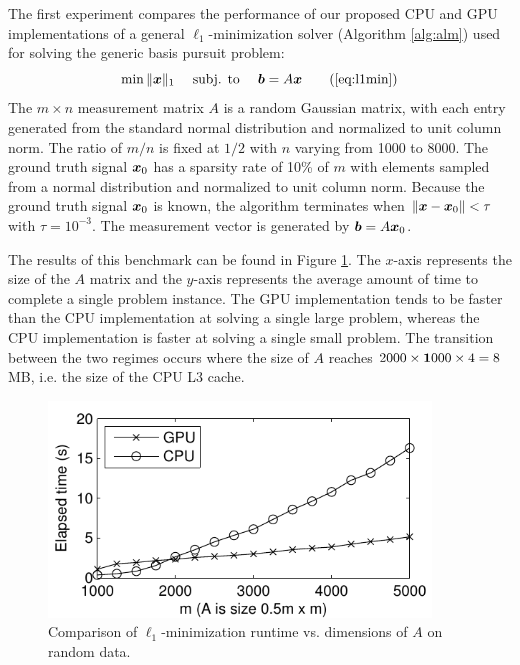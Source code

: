 The first experiment compares the performance of our proposed CPU and GPU
implementations of a general $\ell_1$-minimization solver (Algorithm \eqref{alg:alm})
used for solving the generic basis pursuit problem:
\begin{equation} 
\min \|\xx\|_1\quad \mbox{ subj. to }\quad \bb = A\xx
\tag{\ref{eq:l1min}}
\end{equation}
The $m \times n$ measurement matrix $A$ is a random Gaussian matrix, with each
entry generated from the standard normal distribution and normalized to unit
column norm.  The ratio of $m/n$ is fixed at $1/2$ with $n$ varying from 1000 to 8000.
The ground truth signal ${\boldsymbol{x}}_0$ has a sparsity rate of 10\% of $m$ with
elements sampled from a normal distribution and normalized to unit column
norm.  Because the ground truth signal ${\boldsymbol{x}}_0$ is known, the algorithm
terminates when $\|{\boldsymbol x}-{\boldsymbol x}_0\| < \tau$ with $\tau=10^{-3}$.  The measurement
vector is generated by $\boldsymbol{b} = A {\boldsymbol{x}}_0$.   

The results of this benchmark can be found in Figure \ref{fig:random_data}.
The $x$-axis represents the size of the $A$ matrix and the $y$-axis represents the
average amount of time to complete a single problem instance.  The GPU
implementation tends to be faster than the CPU implementation at solving a
single large problem, whereas the CPU implementation is faster at solving a
single small problem.  The transition between the two regimes occurs where the size of
$A$ reaches $2000 \times {\boldsymbol{1}}000 \times 4 = 8$ MB, i.e. the size of the CPU L3 cache. 
\begin{figure}
\begin{center}
\includegraphics[width=4in]{figures_ijcb/time_vs_matrix_size_constant_tol.pdf}
\end{center} 
\caption{\small Comparison of $\ell_1$-minimization runtime vs. dimensions of $A$ on random data.} 
\label{fig:random_data}
\end{figure}

